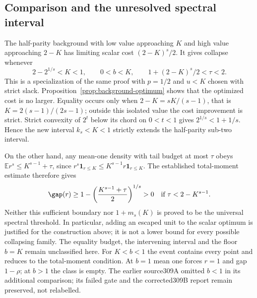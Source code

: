 \subsection*{Comparison and the unresolved spectral interval}
The half-parity background with low value approaching $K$ and high
value approaching $2-K$ has limiting scalar cost $(2-K)^s/2$.
It gives collapse whenever
\[
 2-2^{1/s}<K<1,\qquad 0<b<K,\qquad
 1+(2-K)^s/2<\tau<2.
\]
This is a specialization of the same proof with $p=1/2$ and
$u<K$ chosen with strict slack. Proposition~\ref{prop:background-optimum}
shows that the optimized cost is no larger. Equality occurs only
when $2-K=sK/(s-1)$, that is $K=2(s-1)/(2s-1)$; outside this
isolated value the cost improvement is strict. Strict convexity
of $2^t$ below its chord on $0<t<1$ gives
$2^{1/s}<1+1/s$. Hence the new interval $k_s<K<1$ strictly
extends the half-parity sub-two interval.

On the other hand, any mean-one density with tail budget at most
$\tau$ obeys $\mathbb Er^s\le K^{s-1}+\tau$, since
$r^s\mathbf1_{r\le K}\le K^{s-1}r\mathbf1_{r\le K}$.
The established total-moment estimate therefore gives
\[
 \gap(r)\ge1-\left(\frac{K^{s-1}+\tau}{2}\right)^{1/s}>0
 \quad\hbox{if }\tau<2-K^{s-1}.
\]
Neither this sufficient boundary nor $1+m_s(K)$ is proved to be
the universal spectral threshold. In particular, adding an escaped
unit to the scalar optimum is justified for the construction above;
it is not a lower bound for every possible collapsing family.
The equality budget, the intervening interval and the floor $b=K$
remain unclassified here. For $K<b<1$ the event contains every point
and reduces to the total-moment condition. At $b=1$ mean one forces
$r=1$ and gap $1-\rho$; at $b>1$ the class is empty. The earlier
source309A omitted $b<1$ in its additional comparison; its failed
gate and the corrected309B report remain preserved, not relabelled.
